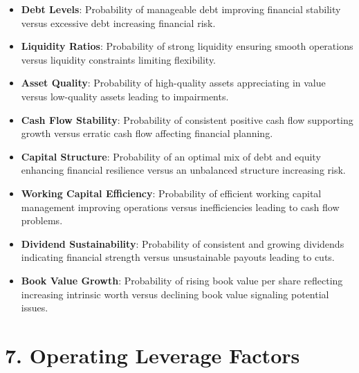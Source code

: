\documentclass[
]{book}
\providecommand{\tightlist}{%
  \setlength{\itemsep}{0pt}\setlength{\parskip}{0pt}}
\begin{document}
\begin{itemize}
\tightlist
\item
  \textbf{Debt Levels}: Probability of manageable debt improving financial stability versus excessive debt increasing financial risk.\\
\item
  \textbf{Liquidity Ratios}: Probability of strong liquidity ensuring smooth operations versus liquidity constraints limiting flexibility.\\
\item
  \textbf{Asset Quality}: Probability of high-quality assets appreciating in value versus low-quality assets leading to impairments.\\
\item
  \textbf{Cash Flow Stability}: Probability of consistent positive cash flow supporting growth versus erratic cash flow affecting financial planning.\\
\item
  \textbf{Capital Structure}: Probability of an optimal mix of debt and equity enhancing financial resilience versus an unbalanced structure increasing risk.\\
\item
  \textbf{Working Capital Efficiency}: Probability of efficient working capital management improving operations versus inefficiencies leading to cash flow problems.\\
\item
  \textbf{Dividend Sustainability}: Probability of consistent and growing dividends indicating financial strength versus unsustainable payouts leading to cuts.\\
\item
  \textbf{Book Value Growth}: Probability of rising book value per share reflecting increasing intrinsic worth versus declining book value signaling potential issues.
\end{itemize}

\section{7. Operating Leverage Factors}\label{operating-leverage-factors}
\end{document}
